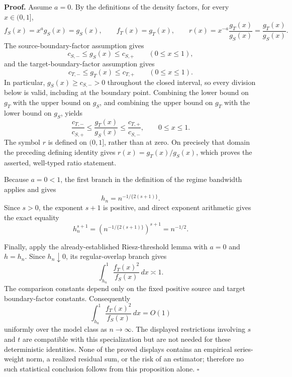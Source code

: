 \textbf{Proof.}
Assume \(a=0\). By the definitions of the density factors, for every \(x\in(0,1]\),
\[
 f_S(x)=x^a g_S(x)=g_S(x),
 \qquad
 f_T(x)=g_T(x),
 \qquad
 r(x)=x^{-a}\frac{g_T(x)}{g_S(x)}=\frac{g_T(x)}{g_S(x)}.
\]
The source-boundary-factor assumption gives
\[
 c_{S,-}\le g_S(x)\le c_{S,+}
 \qquad (0\le x\le1),
\]
and the target-boundary-factor assumption gives
\[
 c_{T,-}\le g_T(x)\le c_{T,+}
 \qquad (0\le x\le1).
\]
In particular, \(g_S(x)\ge c_{S,-}>0\) throughout the closed interval, so every division below is valid, including at the boundary point. Combining the lower bound on \(g_T\) with the upper bound on \(g_S\), and combining the upper bound on \(g_T\) with the lower bound on \(g_S\), yields
\[
 \frac{c_{T,-}}{c_{S,+}}
 \le \frac{g_T(x)}{g_S(x)}
 \le \frac{c_{T,+}}{c_{S,-}},
 \qquad 0\le x\le1.
\]
The symbol \(r\) is defined on \((0,1]\), rather than at zero. On precisely that domain the preceding defining identity gives \(r(x)=g_T(x)/g_S(x)\), which proves the asserted, well-typed ratio statement.

Because \(a=0<1\), the first branch in the definition of the regime bandwidth applies and gives
\[
 h_n=n^{-1/\{2(s+1)\}}.
\]
Since \(s>0\), the exponent \(s+1\) is positive, and direct exponent arithmetic gives the exact equality
\[
 h_n^{s+1}
 =\left(n^{-1/\{2(s+1)\}}\right)^{s+1}
 =n^{-1/2}.
\]

Finally, apply the already-established Riesz-threshold lemma with \(a=0\) and \(h=h_n\). Since \(h_n\downarrow0\), its regular-overlap branch gives
\[
 \int_{h_n}^1\frac{f_T(x)^2}{f_S(x)}\,dx\asymp1.
\]
The comparison constants depend only on the fixed positive source and target boundary-factor constants. Consequently
\[
 \int_{h_n}^1\frac{f_T(x)^2}{f_S(x)}\,dx=O(1)
\]
uniformly over the model class as \(n\to\infty\). The displayed restrictions involving \(s\) and \(t\) are compatible with this specialization but are not needed for these deterministic identities. None of the proved displays contains an empirical series-weight norm, a realized residual sum, or the risk of an estimator; therefore no such statistical conclusion follows from this proposition alone. \(\square\)